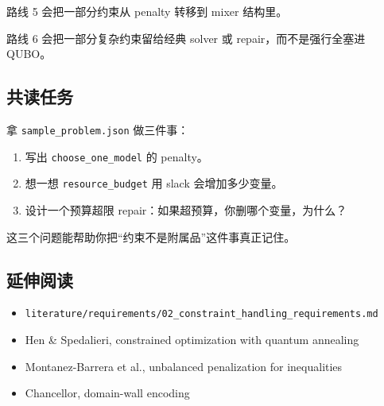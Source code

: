\documentclass[UTF8,12pt,a4paper]{ctexart}
\begin{document}
路线 5 会把一部分约束从 penalty 转移到 mixer 结构里。

路线 6 会把一部分复杂约束留给经典 solver 或 repair，而不是强行全塞进 QUBO。

\subsection*{共读任务}

拿 \texttt{sample\_problem.json} 做三件事：

\begin{enumerate}
\item 写出 \texttt{choose\_one\_model} 的 penalty。
\item 想一想 \texttt{resource\_budget} 用 slack 会增加多少变量。
\item 设计一个预算超限 repair：如果超预算，你删哪个变量，为什么？
\end{enumerate}

这三个问题能帮助你把“约束不是附属品”这件事真正记住。

\subsection*{延伸阅读}

\begin{itemize}
\item \texttt{literature/requirements/02\_constraint\_handling\_requirements.md}
\item Hen \& Spedalieri, constrained optimization with quantum annealing
\item Montanez-Barrera et al., unbalanced penalization for inequalities
\item Chancellor, domain-wall encoding
\end{itemize}
\end{document}
